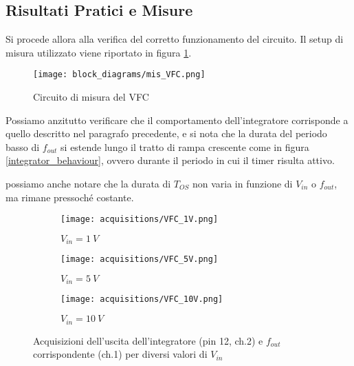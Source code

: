 
\subsection*{Risultati Pratici e Misure}


Si procede allora alla verifica del corretto funzionamento del circuito. Il setup di
misura utilizzato viene riportato in figura \ref{mis_VFC}.

\begin{figure}[H]
    \centering
    \texttt{[image: block\_diagrams/mis\_VFC.png]}
    \caption{Circuito di misura del VFC}
    \label{mis_VFC}
\end{figure}

Possiamo anzitutto verificare che il comportamento dell'integratore corrisponde a quello
descritto nel paragrafo precedente, e si nota che la durata del periodo basso di $f_{out}$
si estende lungo il tratto di rampa crescente come in figura \ref{integrator_behaviour},
ovvero durante il periodo in cui il timer risulta attivo.

possiamo anche notare che la durata di $T_{OS}$ non varia in funzione di $V_{in}$ o $f_{out}$,
ma rimane pressoché costante.

\begin{figure}[H]
    \centering

    \begin{subfigure}{.5\textwidth}
        \centering
        \texttt{[image: acquisitions/VFC\_1V.png]}
        \caption{$V_{in}=1\ V$}
        \label{acq_vfc110_1v}
    \end{subfigure}%
    \begin{subfigure}{.5\textwidth}
        \centering
        \texttt{[image: acquisitions/VFC\_5V.png]}
        \caption{$V_{in}=5\ V$}
        \label{acq_vfc110_5v}
    \end{subfigure}
    \begin{subfigure}{.5\textwidth}
        \centering
        \texttt{[image: acquisitions/VFC\_10V.png]}
        \caption{$V_{in}=10\ V$}
        \label{acq_vfc110_10v}
    \end{subfigure}

    \caption{Acquisizioni dell'uscita dell'integratore (pin 12, ch.2) e $f_{out}$
        corrispondente (ch.1) per diversi valori di $V_{in}$}
    \label{acq_vfc110}
\end{figure}

